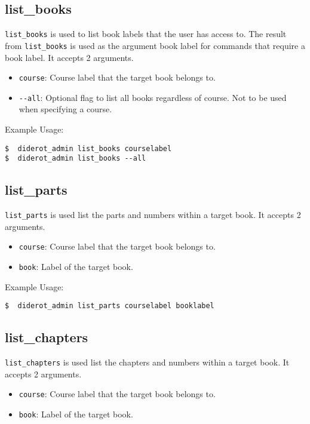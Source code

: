 \subsection{list\_books}

\verb|list_books| is used to list book labels that the user has access to.
%
The result from \verb|list_books| is used as the argument book label for commands
that require a book label.
%
It accepts 2 arguments.

\begin{itemize}
  \item \verb|course|: Course label that the target book belongs to.
  \item \verb|--all|: Optional flag to list all books regardless of course. Not to be used when specifying a course.
\end{itemize}

Example Usage:
\begin{verbatim}
$  diderot_admin list_books courselabel
$  diderot_admin list_books --all
\end{verbatim}

\subsection{list\_parts}

\verb|list_parts| is used list the parts and numbers within a target book.
It accepts 2 arguments.

\begin{itemize}
  \item \verb|course|: Course label that the target book belongs to.
  \item \verb|book|: Label of the target book.
\end{itemize}

Example Usage:
\begin{verbatim}
$  diderot_admin list_parts courselabel booklabel
\end{verbatim}

\subsection{list\_chapters}

\verb|list_chapters| is used list the chapters and numbers within a target book.
It accepts 2 arguments.

\begin{itemize}
  \item \verb|course|: Course label that the target book belongs to.
  \item \verb|book|: Label of the target book.
\end{itemize}

